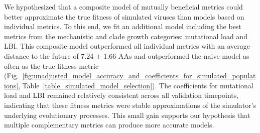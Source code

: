 We hypothesized that a composite model of mutually beneficial metrics could better approximate the true fitness of simulated viruses than models based on individual metrics.
To this end, we fit an additional model including the best metrics from the mechanistic and clade growth categories: mutational load and LBI.
This composite model outperformed all individual metrics with an average distance to the future of 7.24 $\pm$ 1.66 AAs and outperformed the naive model as often as the true fitness metric (Fig.~\ref{fig:unadjusted_model_accuracy_and_coefficients_for_simulated_populations}, Table~\ref{table_simulated_model_selection}).
The coefficients for mutational load and LBI remained relatively consistent across all validation timepoints, indicating that these fitness metrics were stable approximations of the simulator's underlying evolutionary processes.
This small gain supports our hypothesis that multiple complementary metrics can produce more accurate models.

